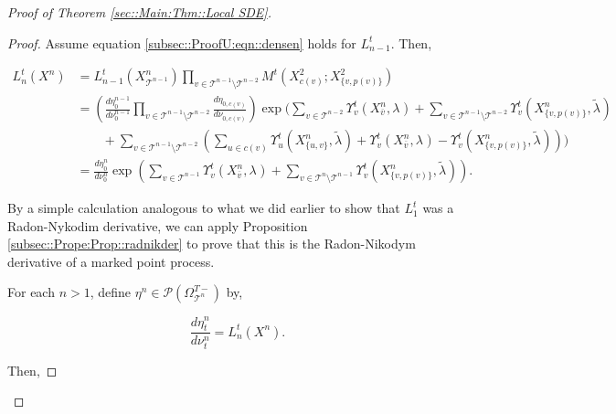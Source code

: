 \documentclass[12pt]{article}
\newcommand{\mc}{\mathcal}
\newcommand{\ov}{\overline}
\newcommand{\ind}{\hspace{24pt}}
\newcommand{\pmsr}{\mc{P}}							%
\renewcommand{\v}{v}							%
\newcommand{\vv}{u}								%
\newcommand{\cl}{\ov}							%
\newcommand{\T}{T}								%
\newcommand{\OmegaV}[2]{\Omega_{#1}^{#2}}		%
\renewcommand{\t}{t}							%
\newcommand{\pup}[1]{^{#1}}							%
\newcommand{\tree}{\mc{T}}							%
\newcommand{\numb}{n}								%
\newcommand{\rxvtsn}[3]{X_{#1}^{#3}{#2}}			%
\newcommand{\mm}[3]{\nu_{#2#1}^{#3}}						%
\newcommand{\mmm}[3]{\eta_{#2#1}^{#3}}						%
\newcommand{\rate}[1]{\lambda_{#1}}					%
\newcommand{\crate}[2]{\alt{\lambda}_{#1}^{#2}}		%
\newcommand{\alt}{\widetilde}						%
\newcommand{\dense}[2]{L_{#1}^{#2}}				%
\newcommand{\cdense}[2]{M_{#1}^{#2}}			%
\newcommand{\ds}[2]{\Upsilon_{#1}^{#2}}			%
\renewcommand{\c}[1]{c(#1)}						%
\newcommand{\p}[1]{p(#1)}						%
\begin{document}
\begin{proof}[Proof of Theorem \ref{sec::Main:Thm::Local SDE}]
\begin{proof}
Assume equation \eqref{subsec::ProofU:eqn::densen} holds for \(\dense{\numb-1}{\t}\). Then,

\begin{align*}
\dense{\numb}{\t}(\rxvtsn{}{}{\numb}) &= \dense{\numb-1}{\t}(\rxvtsn{\tree\pup{\numb-1}}{}{\numb})\prod_{\v\in\tree\pup{\numb-1}\setminus\tree\pup{\numb-2}} \cdense{}{\t}(\rxvtsn{\c{\v}}{}{2};\rxvtsn{\{\v,\p{\v}\}}{}{2})\\
&=\left(\frac{d\mmm{}{0}{\numb-1}}{d\mm{}{0}{\numb-1}}\prod_{\v\in\tree\pup{\numb-1}\setminus\tree\pup{\numb-2}}\frac{d\mmm{\c{\v}}{0,}{}}{d\mm{\c{\v}}{0,}{}}\right)\exp\Bigg(\sum_{\v\in\tree\pup{\numb-2}}\ds{\v}{\t}(\rxvtsn{\cl{\v}}{}{\numb},\rate{}) + \sum_{\v\in\tree\pup{\numb-1}\setminus\tree\pup{\numb-2}} \ds{\v}{\t}(\rxvtsn{\{\v,\p{\v}\}}{}{\numb},\crate{}{})\\
&\ind + \sum_{\v\in\tree\pup{\numb-1}\setminus\tree\pup{\numb-2}}\left(\sum_{\vv\in \c{\v}} \ds{\vv}{\t}(\rxvtsn{\{\vv,\v\}}{}{\numb},\crate{}{}) + \ds{\v}{\t}(\rxvtsn{\cl{\v}}{}{\numb},\rate{}) - \ds{\v}{\t}(\rxvtsn{\{\v,\p{\v}\}}{}{\numb},\crate{}{})\right)\Bigg)\\
&=\frac{d\mmm{}{0}{\numb}}{d\mm{}{0}{\numb}}\exp\left(\sum_{\v\in\tree\pup{\numb-1}}\ds{\v}{\t}(\rxvtsn{\cl{\v}}{}{\numb},\rate{}) + \sum_{\v\in\tree\pup{\numb}\setminus\tree\pup{\numb-1}} \ds{\v}{\t}(\rxvtsn{\{\v,\p{\v}\}}{}{\numb},\crate{}{})\right).
\end{align*}

By a simple calculation analogous to what we did earlier to show that \(\dense{1}{\t}\) was a Radon-Nykodim derivative, we can apply Proposition \ref{subsec::Prope:Prop::radnikder} to prove that this is the Radon-Nikodym derivative of a marked point process. 

\ind For each \(\numb > 1\), define \(\mmm{}{}{\numb} \in \pmsr(\OmegaV{\tree\pup{\numb}}{\T-})\) by,

\[\frac{d\mmm{}{\t}{\numb}}{d\mm{}{\t}{\numb}} = \dense{\numb}{\t}(\rxvtsn{}{}{\numb}).\]

Then,


\end{proof}
\end{proof}
\end{document}
